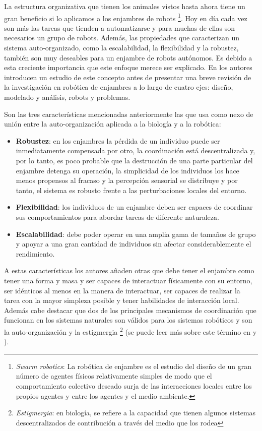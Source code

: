 La estructura organizativa que tienen los animales vistos hasta ahora tiene un gran beneficio si lo aplicamos a los enjambres de robots \footnote{\textit{Swarm robotics}: La robótica de enjambre es el estudio del diseño de un gran número de agentes físicos relativamente simples de modo que el comportamiento colectivo deseado surja de las interacciones locales entre los propios agentes y entre los agentes y el medio ambiente.\cite{csahin2004swarm}}. Hoy en día cada vez son más las tareas que tienden a automatizarse y para muchas de ellas son necesarios un grupo de robots. Además, las propiedades que caracterizan un sistema auto-organizado, como la escalabilidad, la flexibilidad y la robustez, también son muy deseables para un enjambre de robots autónomos. Es debido a esta creciente importancia que este enfoque merece ser explicado. En \cite{christian2008swarm} los autores introducen un estudio de este concepto antes de presentar una breve revisión de la investigación en robótica de enjambres a lo largo de cuatro ejes: diseño, modelado y análisis, robots y problemas.

Son las tres características mencionadas anteriormente las que usa como nexo de unión entre la auto-organización aplicada a la biología y a la robótica: 

\begin{itemize}
    \item \textbf{Robustez}: en los enjambres la pérdida de un individuo puede ser inmediatamente compensada por otro, la coordinación está descentralizada y, por lo tanto, es poco probable que la destrucción de una parte particular del enjambre detenga su operación, la simplicidad de los individuos los hace menos propensos al fracaso y la percepción sensorial se distribuye y por tanto, el sistema es robusto frente a las perturbaciones locales del entorno.
    \item \textbf{Flexibilidad}: los individuos de un enjambre deben ser capaces de coordinar sus comportamientos para abordar tareas de diferente naturaleza.
    \item \textbf{Escalabilidad}: debe poder operar en una amplia gama de tamaños de grupo y apoyar a una gran cantidad de individuos sin afectar considerablemente el rendimiento.
\end{itemize}

A estas características los autores añaden otras que debe tener el enjambre como tener una forma y masa y ser capaces de interactuar físicamente con su entorno, ser idénticos al menos en la manera de interactuar, ser capaces de realizar la tarea con la mayor simpleza posible y tener habilidades de interacción local. Además cabe destacar que dos de los principales mecanismos de coordinación que funcionan en los sistemas naturales son válidos para los sistemas robóticos y son la auto-organización y la estigmergia \footnote{\textit{Estigmergia}: en biología, se refiere a la capacidad que tienen algunos sistemas descentralizados de contribución a través del medio que los rodea} (se puede leer más sobre este término en \cite{estigmergia1} y \cite{estigmergia2}). 

